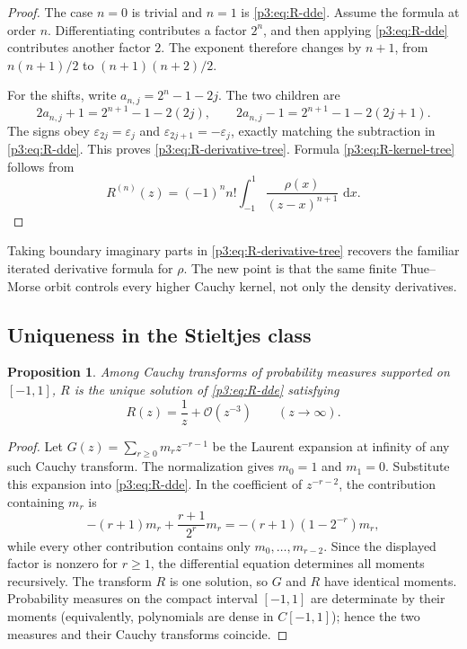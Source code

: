 \documentclass[11pt]{article}
\newtheorem{proposition}[theorem]{Proposition}
\theoremstyle{definition}
\theoremstyle{remark}
\newcommand{\dd}{\,\mathrm d}
\newcommand{\eps}{\varepsilon}
\newcommand{\bigO}{\mathcal O}
\begin{document}
\begin{proof}
The case \(n=0\) is trivial and \(n=1\) is \eqref{p3:eq:R-dde}.  Assume the formula at
order \(n\).  Differentiating contributes a factor \(2^n\), and then applying
\eqref{p3:eq:R-dde} contributes another factor \(2\).  The exponent therefore changes by
\(n+1\), from \(n(n+1)/2\) to \((n+1)(n+2)/2\).

For the shifts, write \(a_{n,j}=2^n-1-2j\).  The two children are
\[
 2a_{n,j}+1=2^{n+1}-1-2(2j),
 \qquad
 2a_{n,j}-1=2^{n+1}-1-2(2j+1).
\]
The signs obey \(\eps_{2j}=\eps_j\) and \(\eps_{2j+1}=-\eps_j\), exactly matching the
subtraction in \eqref{p3:eq:R-dde}.  This proves \eqref{p3:eq:R-derivative-tree}.  Formula
\eqref{p3:eq:R-kernel-tree} follows from
\[
 R^{(n)}(z)=(-1)^n n!\int_{-1}^{1}\frac{\rho(x)}{(z-x)^{n+1}}\,\dd x.
\]
\end{proof}

Taking boundary imaginary parts in \eqref{p3:eq:R-derivative-tree} recovers the familiar
iterated derivative formula for \(\rho\).  The new point is that the same finite
Thue--Morse orbit controls every higher Cauchy kernel, not only the density derivatives.

\subsection{Uniqueness in the Stieltjes class}

\begin{proposition}\label{p3:prop:R-uniqueness}
Among Cauchy transforms of probability measures supported on \([-1,1]\), \(R\) is the
unique solution of \eqref{p3:eq:R-dde} satisfying
\begin{equation}
 R(z)=\frac1z+\bigO(z^{-3})\qquad(z\to\infty).               \label{p3:eq:R-normalization}
\end{equation}
\end{proposition}

\begin{proof}
Let \(G(z)=\sum_{r\ge0}m_r z^{-r-1}\) be the Laurent expansion at infinity of any such
Cauchy transform.  The normalization gives \(m_0=1\) and \(m_1=0\).  Substitute this
expansion into \eqref{p3:eq:R-dde}.  In the coefficient of \(z^{-r-2}\), the contribution
containing \(m_r\) is
\[
 -(r+1)m_r+\frac{r+1}{2^r}m_r
 =-(r+1)(1-2^{-r})m_r,
\]
while every other contribution contains only \(m_0,\ldots,m_{r-2}\).  Since the displayed
factor is nonzero for \(r\ge1\), the differential equation determines all moments
recursively.  The transform \(R\) is one solution, so \(G\) and \(R\) have identical
moments.  Probability measures on the compact interval \([-1,1]\) are determinate by their
moments (equivalently, polynomials are dense in \(C[-1,1]\)); hence the two measures and
their Cauchy transforms coincide.
\end{proof}
\end{document}
